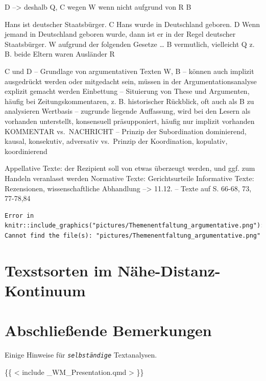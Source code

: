\documentclass[
  letterpaper,
]{scrbook}
\begin{document}
D --\textgreater{} deshalb Q, C wegen W wenn nicht aufgrund von R B

Hans ist deutscher Staatsbürger. C Hans wurde in Deutschland geboren. D
Wenn jemand in Deutschland geboren wurde, dann ist er in der Regel
deutscher Staatsbürger. W aufgrund der folgenden Gesetze \ldots{} B
vermutlich, vielleicht Q z. B. beide Eltern waren Ausländer R

C und D -- Grundlage von argumentativen Texten W, B -- können auch
implizit ausgedrückt werden oder mitgedacht sein, müssen in der
Argumentationsanalyse explizit gemacht werden Einbettung -- Situierung
von These und Argumenten, häufig bei Zeitungskommentaren, z. B.
historischer Rückblick, oft auch als B zu analysieren Wertbasis --
zugrunde liegende Auffassung, wird bei den Lesern als vorhanden
unterstellt, konsensuell präsupponiert, häufig nur implizit vorhanden
KOMMENTAR vs.~NACHRICHT -- Prinzip der Subordination dominierend,
kausal, konsekutiv, adversativ vs.~Prinzip der Koordination, kopulativ,
koordinierend

Appellative Texte: der Rezipient soll von etwas überzeugt werden, und
ggf. zum Handeln veranlasst werden Normative Texte: Gerichtsurteile
Informative Texte: Rezensionen, wissenschaftliche Abhandlung
--\textgreater{} 11.12. -- Texte auf S. 66-68, 73, 77-78,84

\begin{verbatim}
Error in knitr::include_graphics("pictures/Themenentfaltung_argumentative.png"): Cannot find the file(s): "pictures/Themenentfaltung_argumentative.png"
\end{verbatim}

\hypertarget{texstsorten-im-nuxe4he-distanz-kontinuum}{%
\chapter{Texstsorten im
Nähe-Distanz-Kontinuum}\label{texstsorten-im-nuxe4he-distanz-kontinuum}}


\hypertarget{abschlieuxdfende-bemerkungen}{%
\chapter{Abschließende Bemerkungen}\label{abschlieuxdfende-bemerkungen}}

Einige Hinweise für \emph{\texttt{selbständige}} Textanalysen. 🤗

\{\{ \textless{} include \_WM\_Presentation.qmd \textgreater{} \}\}
\end{document}
